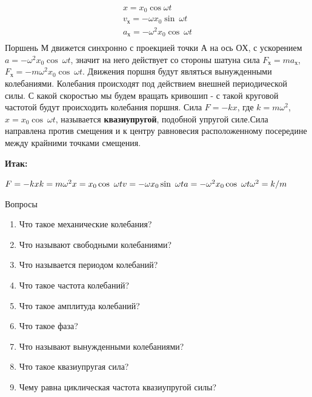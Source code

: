 \documentclass[a6paper, 11pt]{diss_4}
\renewcommand{\'}{\,'}
\begin{document}
 \\
\begin{gather*}
x = x_0\cos\omega t\\
v_х = -\omega x_0\sin\ \omega t\\
a_х= -\omega^2x_0\cos\ \omega t\\
\end{gather*}
Поршень $М$ движется синхронно с проекцией точки $А$ на ось $ОХ$, с ускорением  $a= -\omega^2x_0\cos\ \omega t$, значит на него действует со стороны шатуна сила $F_х=ma_х$, $F_х= -m\omega^2x_0\cos\ \omega t$. Движения поршня будут являться вынужденными колебаниями. Колебания происходят под действием внешней периодической силы. С какой скоростью мы будем вращать кривошип - с такой круговой частотой будут происходить колебания поршня. Сила $F= -kx$, где $k=m\omega^2$, $x=x_0\cos\ \omega t$,  называется
\textbf{квазиупругой}, подобной упругой силе.Сила направлена против смещения и к центру равновесия расположенному посередине между крайними точками смещения.

\textbf{Итак:}\hspace{.3cm}
\parbox[t]{15cm}{
$
F=-kx\\
k=m\omega^2\\
x=x_0\cos\ \omega t\\
v = -\omega x_0\sin\ \omega t\\
a= -\omega^2x_0\cos\ \omega t\\
\omega^2=k/m\\
$
}

\begin{center}
   Вопросы
\end{center}
\begin{enumerate}

\item Что такое механические колебания?
\item Что называют свободными колебаниями?
\item Что называется периодом колебаний?
\item Что такое частота колебаний?
\item Что такое амплитуда колебаний?
\item Что такое фаза?
\item Что называют вынужденными колебаниями?
\item Что такое квазиупругая сила?
\item Чему равна циклическая частота квазиупругой силы?

\end{enumerate}
\end{document}
